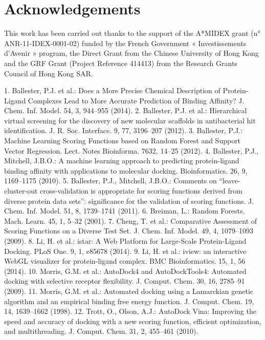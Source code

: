 \documentclass{llncs}
\begin{document}
\section{Acknowledgements}

This work has been carried out thanks to the support of the A*MIDEX grant (n° ANR-11-IDEX-0001-02) funded by the French Government « Investissements d’Avenir » program, the Direct Grant from the Chinese University of Hong Kong and the GRF Grant (Project Reference 414413) from the Research Grants Council of Hong Kong SAR.

1.	Ballester, P.J. et al.: Does a More Precise Chemical Description of Protein-Ligand Complexes Lead to More Accurate Prediction of Binding Affinity? J. Chem. Inf. Model. 54, 3, 944–955 (2014).
2.	Ballester, P.J. et al.: Hierarchical virtual screening for the discovery of new molecular scaffolds in antibacterial hit identification. J. R. Soc. Interface. 9, 77, 3196–207 (2012).
3.	Ballester, P.J.: Machine Learning Scoring Functions based on Random Forest and Support Vector Regression. Lect. Notes Bioinforma. 7632, 14–25 (2012).
4.	Ballester, P.J., Mitchell, J.B.O.: A machine learning approach to predicting protein-ligand binding affinity with applications to molecular docking. Bioinformatics. 26, 9, 1169–1175 (2010).
5.	Ballester, P.J., Mitchell, J.B.O.: Comments on “leave-cluster-out cross-validation is appropriate for scoring functions derived from diverse protein data sets”: significance for the validation of scoring functions. J. Chem. Inf. Model. 51, 8, 1739–1741 (2011).
6.	Breiman, L.: Random Forests. Mach. Learn. 45, 1, 5–32 (2001).
7.	Cheng, T. et al.: Comparative Assessment of Scoring Functions on a Diverse Test Set. J. Chem. Inf. Model. 49, 4, 1079–1093 (2009).
8.	Li, H. et al.: istar: A Web Platform for Large-Scale Protein-Ligand Docking. PLoS One. 9, 1, e85678 (2014).
9.	Li, H. et al.: iview: an interactive WebGL visualizer for protein-ligand complex. BMC Bioinformatics. 15, 1, 56 (2014).
10.	Morris, G.M. et al.: AutoDock4 and AutoDockTools4: Automated docking with selective receptor flexibility. J. Comput. Chem. 30, 16, 2785–91 (2009).
11.	Morris, G.M. et al.: Automated docking using a Lamarckian genetic algorithm and an empirical binding free energy function. J. Comput. Chem. 19, 14, 1639–1662 (1998).
12.	Trott, O., Olson, A.J.: AutoDock Vina: Improving the speed and accuracy of docking with a new scoring function, efficient optimization, and multithreading. J. Comput. Chem. 31, 2, 455–461 (2010). 



\end{document}

